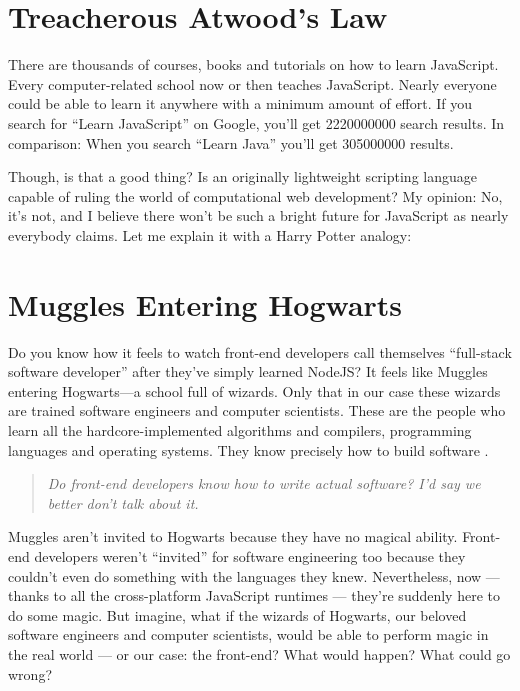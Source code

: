 \documentclass[11pt]{article}
\begin{document}
\section{Treacherous Atwood’s Law}
\label{sec:atwood-law}

There are thousands of courses, books and tutorials on how to learn JavaScript. Every computer-related school now or then teaches JavaScript. Nearly everyone could be able to learn it anywhere with a minimum amount of effort. If you search for “Learn JavaScript” on Google, you’ll get \num{2220000000} search results. In comparison: When you search “Learn Java” you’ll get \num{305000000} results.

Though, is that a good thing? Is an originally lightweight scripting language capable of ruling the world of computational web development? My opinion: No, it’s not, and I believe there won’t be such a bright future for JavaScript as nearly everybody claims. Let me explain it with a Harry Potter analogy:

\section{Muggles Entering Hogwarts}
\label{sec:muggles}

Do you know how it feels to watch front-end developers call themselves “full-stack software developer” after they’ve simply learned NodeJS? It feels like Muggles entering Hogwarts—a school full of wizards. Only that in our case these wizards are trained software engineers and computer scientists. These are the people who learn all the hardcore-implemented algorithms and compilers, programming languages and operating systems. They know precisely how to build software \citep{might_what_2011}.

\begin{quote}
  \emph{Do front-end developers know how to write actual software? I’d say we better don’t talk about it.}
\end{quote}

Muggles aren’t invited to Hogwarts because they have no magical ability. Front-end developers weren’t “invited” for software engineering too because they couldn’t even do something with the languages they knew. Nevertheless, now — thanks to all the cross-platform JavaScript runtimes — they’re suddenly here to do some magic. But imagine, what if the wizards of Hogwarts, our beloved software engineers and computer scientists, would be able to perform magic in the real world — or our case: the front-end? What would happen? What could go wrong?
\end{document}
